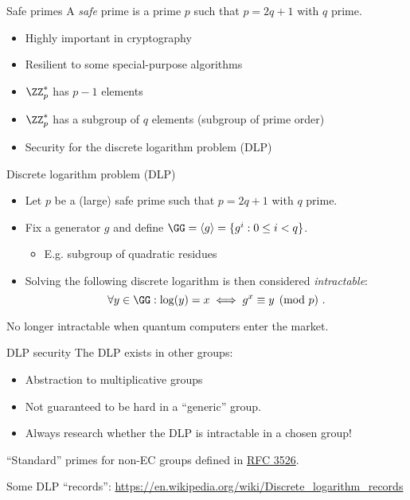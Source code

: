 \begin{frame}{Safe primes}
  A \emph{safe} prime is a prime $p$ such that $p = 2q + 1$ with $q$ prime.
  \begin{itemize}[<+(1)->]
    \item Highly important in cryptography
    \item Resilient to some special-purpose algorithms
    \item $\ZZ_p^*$ has $p-1$ elements
    \item $\ZZ_p^*$ has a subgroup of $q$ elements (subgroup of prime order)
    \item Security for the discrete logarithm problem (DLP)
  \end{itemize}
\end{frame}

\begin{frame}{Discrete logarithm problem (DLP)}
  \begin{itemize}[<+(1)->]
    \item Let $p$ be a (large) safe prime such that $p = 2q + 1$ with $q$ prime.
    \item Fix a generator $g$ and define $\GG = \langle g \rangle = \{g^i :0 \le i < q\}$.
    \begin{itemize}
      \item E.g. subgroup of quadratic residues
    \end{itemize}
    \item Solving the following discrete logarithm is then considered \emph{intractable}:
    \[
      \forall y\in\GG: \log(y) = x \iff g^x \equiv y \pmod{p}\ .
    \]
  \end{itemize}

  \pause
  No longer intractable when quantum computers enter the market.
\end{frame}

\begin{frame}{DLP security}
  The DLP exists in other groups:
  \begin{itemize}[<+(1)->]
    \item Abstraction to multiplicative groups
    \item Not guaranteed to be hard in a \enquote{generic} group.
    \item Always research whether the DLP is intractable in a chosen group!
  \end{itemize}

  \pause
  \enquote{Standard} primes for non-EC groups defined in \href{https://datatracker.ietf.org/doc/html/rfc3526}{RFC 3526}.

  \pause
  Some DLP \enquote{records}: \url{https://en.wikipedia.org/wiki/Discrete_logarithm_records}
\end{frame}

